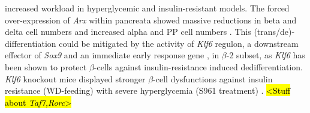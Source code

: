 increased workload in hyperglycemic and insulin-resistant models. The forced over-expression of \textit{Arx} within pancreata showed massive reductions in beta and delta cell numbers and increased alpha and PP cell numbers \textbf{\cite{van_der_meulen_role_2015}}. This (trans/de)-differentiation could be mitigated by the activity of \textit{Klf6} regulon, a downstream effector of \textit{Sox9} \textbf{\cite{puri_sox9_2024}} and an immediate early response gene \textbf{\cite{xin_single-cell_2016}}, in $\beta$-2 subset, as \textit{Klf6} has been shown to protect $\beta$-cells against insulin-resistance induced dedifferentiation. \textit{Klf6} knockout mice displayed stronger $\beta$-cell dysfunctions against insulin resistance (WD-feeding) with severe hyperglycemia (S961 treatment) \textbf{\cite{dumayne_klf6_2020}}. \hl{<Stuff about \textit{Taf7,Rorc}>}\\







